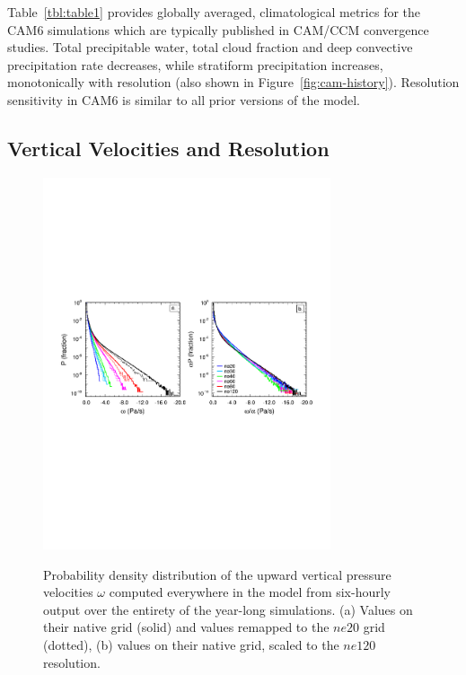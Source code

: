 \documentclass[times]{qjrms4}
\begin{document}
Table~\ref{tbl:table1} provides globally averaged, climatological metrics for the CAM6 simulations which are typically published in CAM/CCM convergence studies. Total precipitable water, total cloud fraction and deep convective precipitation rate decreases, while stratiform precipitation increases, monotonically with resolution (also shown in Figure~\ref{fig:cam-history}). Resolution sensitivity in CAM6 is similar to all prior versions of the model. 

\subsection{Vertical Velocities and Resolution}

\begin{figure}
\begin{center}
\noindent\includegraphics[width=20pc,angle=0]{figs/temp_2pdf.pdf}\\
\end{center}
\caption{Probability density distribution of the upward vertical pressure velocities $\omega$ computed everywhere in the model from six-hourly output over the entirety of the year-long simulations. (a) Values on their native grid (solid) and values remapped to the $ne20$ grid (dotted), (b) values on their native grid, scaled to the $ne120$ resolution.}
\label{fig:2pdf}
\end{figure}
\end{document}
